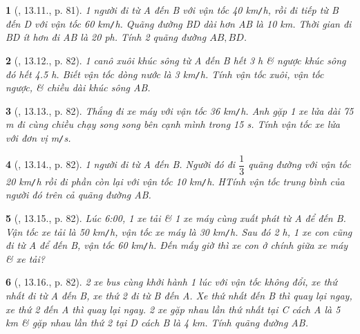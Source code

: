 \documentclass{article}
\newtheorem{baitoan}{}
\begin{document}
\begin{baitoan}[\cite{TLCT_THCS_Toan_6_so_hoc}, 13.11., p. 81]
	1 người đi từ A đến B với vận tốc {\rm40 km{\tt/}h}, rồi đi tiếp từ B đến D với vận tốc {\rm60 km{\tt/}h}. Quãng đường BD dài hơn AB là {\rm10 km}. Thời gian đi BD ít hơn đi AB là {\rm20 ph}. Tính 2 quãng đường $AB,BD$.
\end{baitoan}

\begin{baitoan}[\cite{TLCT_THCS_Toan_6_so_hoc}, 13.12., p. 82]
	1 canô xuôi khúc sông từ A đến B hết {\rm3 h} \& ngược khúc sông đó hết {\rm4.5 h}. Biết vận tốc dòng nước là {\rm3 km{\tt/}h}. Tính vận tốc xuôi, vận tốc ngược, \& chiều dài khúc sông AB.
\end{baitoan}

\begin{baitoan}[\cite{TLCT_THCS_Toan_6_so_hoc}, 13.13., p. 82]
	Thắng đi xe máy với vận tốc {\rm36 km{\tt/}h}. Anh gặp 1 xe lửa dài {\rm75 m} đi cùng chiều chạy song song bên cạnh mình trong {\rm15 s}. Tính vận tốc xe lửa với đơn vị {\rm m{\tt/}s}.
\end{baitoan}

\begin{baitoan}[\cite{TLCT_THCS_Toan_6_so_hoc}, 13.14., p. 82]
	1 người đi từ A đến B. Người đó đi $\dfrac{1}{3}$ quãng đường với vận tốc {\rm20 km{\tt/}h} rồi đi phần còn lại với vận tốc {\rm10 km{\tt/}h}. HTính vận tốc trung bình của người đó trên cả quãng đường AB.
\end{baitoan}

\begin{baitoan}[\cite{TLCT_THCS_Toan_6_so_hoc}, 13.15., p. 82]
	Lúc {\rm6:00}, 1 xe tải \& 1 xe máy cùng xuất phát từ A để đến B. Vận tốc xe tải là {\rm50 km{\tt/}h}, vận tốc xe máy là {\rm30 km{\tt/}h}. Sau đó {\rm2 h}, 1 xe con cũng đi từ A để đến B, vận tốc {\rm60 km{\tt/}h}. Đến mấy giờ thì xe con ở chính giữa xe máy \& xe tải?
\end{baitoan}

\begin{baitoan}[\cite{TLCT_THCS_Toan_6_so_hoc}, 13.16., p. 82]
	2 xe bus cùng khởi hành 1 lúc với vận tốc không đổi, xe thứ nhất đi từ A đến B, xe thứ 2 đi từ B đến A. Xe thứ nhất đến B thì quay lại ngay, xe thứ 2 đến A thì quay lại ngay. 2 xe gặp nhau lần thứ nhất tại C cách A là {\rm5 km} \& gặp nhau lần thứ 2 tại D cách B là {\rm4 km}. Tính quãng đường AB.
\end{baitoan}

\end{document}
